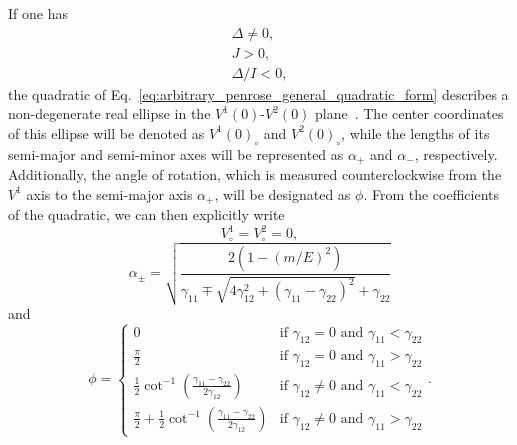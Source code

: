 If one has
%
\begin{align}
  \Delta \neq 0, \\
  J > 0,         \\
  \Delta / I < 0,
\end{align}
%
the quadratic of Eq.~\eqref{eq:arbitrary_penrose_general_quadratic_form} describes a non-degenerate real ellipse in the $V^1(0)$-$V^2(0)$ plane~\cite{Hart2002}. The center coordinates of this ellipse will be denoted as $V^1(0)_\circ$ and $V^2(0)_\circ$, while the lengths of its semi-major and semi-minor axes will be represented as $\alpha_+$ and $\alpha_-$, respectively. Additionally, the angle of rotation, which is measured counterclockwise from the $V^1$ axis to the semi-major axis $\alpha_+$, will be designated as $\phi$. From the coefficients of the quadratic, we can then explicitly write~\cite{Larson2006, Young2010, Lawrence2014}
%
\begin{equation}
  V^1_\circ = V^2_\circ = 0,
  \label{eq:arbitrary_penrose_ellipse_centers}
\end{equation}
%
\begin{equation}
  \alpha_\pm = \sqrt{ \frac{2 \left( 1 - \left(m/E\right)^2 \right)}{\gamma_{11} \mp \sqrt{4 \gamma_{12}^2 + \left( \gamma_{11} - \gamma_{22} \right)^2} +\gamma_{22}} }
  \label{eq:arbitrary_penrose_ellipse_axis}
\end{equation}
%
and
\begin{equation}
  \phi =
  \begin{cases}
    0                                                                                                 & \text{if } \gamma_{12} = 0 \text{ and } \gamma_{11} < \gamma_{22}    \\
    \frac{\pi}{2}                                                                                     & \text{if } \gamma_{12} = 0 \text{ and } \gamma_{11} > \gamma_{22}    \\
    \frac{1}{2} \cot^{-1} \left( \frac{\gamma_{11}-\gamma_{22}}{2\gamma_{12}} \right)                 & \text{if } \gamma_{12} \neq 0 \text{ and } \gamma_{11} < \gamma_{22} \\
    \frac{\pi}{2} + \frac{1}{2} \cot^{-1} \left( \frac{\gamma_{11}-\gamma_{22}}{2\gamma_{12}} \right) & \text{if } \gamma_{12} \neq 0 \text{ and } \gamma_{11} > \gamma_{22}
  \end{cases}
  .
  \label{eq:arbitrary_penrose_ellipse_angle}
\end{equation}

